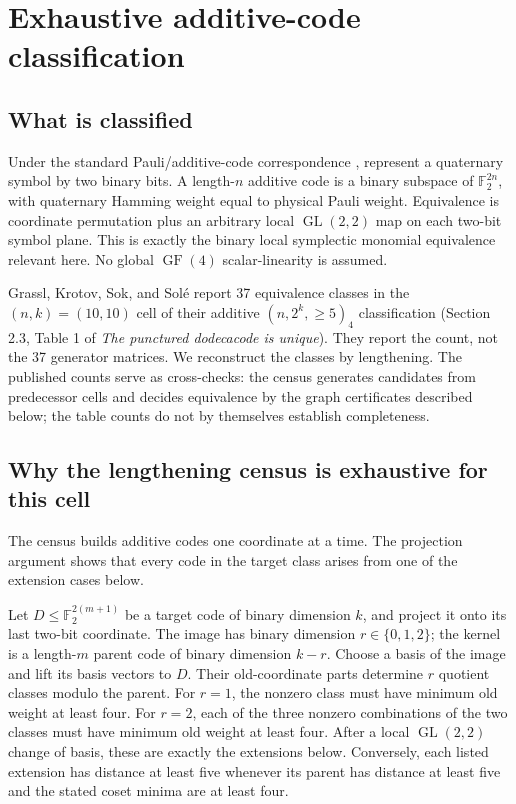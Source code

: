 \documentclass[11pt]{article}
\begin{document}
\section{Exhaustive additive-code classification}\label{exhaustive-additive-code-classification}

\subsection{What is classified}\label{what-is-classified}

Under the standard Pauli/additive-code correspondence \cite{calderbank-shor-sloane}, represent a quaternary symbol by two binary bits. A length-\(n\) additive code is a binary subspace of \(\mathbb{F}_{2}^{2n}\), with quaternary Hamming weight equal to physical Pauli weight. Equivalence is coordinate permutation plus an arbitrary local \(\operatorname{GL}(2,2)\) map on each two-bit symbol plane. This is exactly the binary local symplectic monomial equivalence relevant here. No global \(\operatorname{GF}(4)\) scalar-linearity is assumed.

Grassl, Krotov, Sok, and Solé \cite{grassl-et-al} report 37 equivalence classes in the \((n,k)=(10,10)\) cell of their additive \((n,2^{k}, \ge 5)_{4}\) classification (Section 2.3, Table 1 of \emph{The punctured dodecacode is unique}). They report the count, not the 37 generator matrices. We reconstruct the classes by lengthening. The published counts serve as cross-checks: the census generates candidates from predecessor cells and decides equivalence by the graph certificates described below; the table counts do not by themselves establish completeness.

\subsection{Why the lengthening census is exhaustive for this cell}\label{why-the-lengthening-census-is-exhaustive-for-this-cell}

The census builds additive codes one coordinate at a time. The projection argument shows that every code in the target class arises from one of the extension cases below.

Let \(D\leq\mathbb{F}_2^{2(m+1)}\) be a target code of binary dimension \(k\), and project it onto its last two-bit coordinate. The image has binary dimension \(r\in\{0,1,2\}\); the kernel is a length-\(m\) parent code of binary dimension \(k-r\). Choose a basis of the image and lift its basis vectors to \(D\). Their old-coordinate parts determine \(r\) quotient classes modulo the parent. For \(r=1\), the nonzero class must have minimum old weight at least four. For \(r=2\), each of the three nonzero combinations of the two classes must have minimum old weight at least four. After a local \(\operatorname{GL}(2,2)\) change of basis, these are exactly the extensions below. Conversely, each listed extension has distance at least five whenever its parent has distance at least five and the stated coset minima are at least four.
\end{document}
